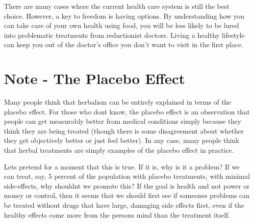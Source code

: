 There are many cases where the current health care system is still the
best choice. However, a key to freedom is having options. By
understanding how you can take care of your own health using food, you
will be less likely to be lured into problematic treatments from
reductionist doctors. 
Living a healthy
lifestyle can keep you out of the doctor’s office you don’t want to
visit in the first place.

\section{Note - The Placebo Effect}

Many people think that herbalism can be entirely explained in terms of
the placebo effect. For those who don{\textquotesingle}t know, the
placebo effect is an observation that people can get measurably better
from medical conditions simply because they think they are being
treated (though there is some disagreement about whether they get
objectively better or just feel better). In any case, many people think
that herbal treatments are simply examples of the placebo effect in
practice. 


Let{\textquotesingle}s pretend for a moment that this is true. If
it is, why is
it a problem?  If we
can treat, say, 5 percent of the population with placebo treatments,
with minimal side-effects, why shouldn{\textquotesingle}t we promote
this?  If the goal is health and not power or money or control, then it
seems that we should first see if someone{\textquotesingle}s problems
can be treated without drugs
that have large,
damaging side effects first, even if the healthy effects come more from
the person{\textquotesingle}s mind than the treatment itself.


